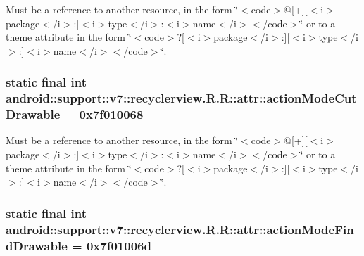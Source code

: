 Must be a reference to another resource, in the form \char`\"{}$<$code$>$@\mbox{[}+\mbox{]}\mbox{[}$<$i$>$package$<$/i$>$:\mbox{]}$<$i$>$type$<$/i$>$:$<$i$>$name$<$/i$>$$<$/code$>$\char`\"{} or to a theme attribute in the form \char`\"{}$<$code$>$?\mbox{[}$<$i$>$package$<$/i$>$:\mbox{]}\mbox{[}$<$i$>$type$<$/i$>$:\mbox{]}$<$i$>$name$<$/i$>$$<$/code$>$\char`\"{}. \hypertarget{classandroid_1_1support_1_1v7_1_1recyclerview_1_1_r_1_1attr_d0d7980baad698727e2946c8baedd61d}{
\subsubsection[{actionModeCutDrawable}]{\setlength{\rightskip}{0pt plus 5cm}static final int android::support::v7::recyclerview.R.R::attr::actionModeCutDrawable = 0x7f010068}}
\label{classandroid_1_1support_1_1v7_1_1recyclerview_1_1_r_1_1attr_d0d7980baad698727e2946c8baedd61d}


Must be a reference to another resource, in the form \char`\"{}$<$code$>$@\mbox{[}+\mbox{]}\mbox{[}$<$i$>$package$<$/i$>$:\mbox{]}$<$i$>$type$<$/i$>$:$<$i$>$name$<$/i$>$$<$/code$>$\char`\"{} or to a theme attribute in the form \char`\"{}$<$code$>$?\mbox{[}$<$i$>$package$<$/i$>$:\mbox{]}\mbox{[}$<$i$>$type$<$/i$>$:\mbox{]}$<$i$>$name$<$/i$>$$<$/code$>$\char`\"{}. \hypertarget{classandroid_1_1support_1_1v7_1_1recyclerview_1_1_r_1_1attr_63a153cd12ddf16702789395b6a42c51}{
\subsubsection[{actionModeFindDrawable}]{\setlength{\rightskip}{0pt plus 5cm}static final int android::support::v7::recyclerview.R.R::attr::actionModeFindDrawable = 0x7f01006d}}
\label{classandroid_1_1support_1_1v7_1_1recyclerview_1_1_r_1_1attr_63a153cd12ddf16702789395b6a42c51}


